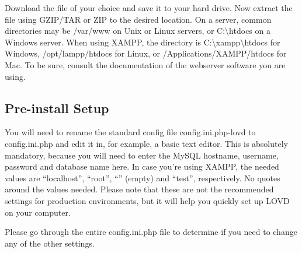 \documentclass[a4paper,oneside,openany,12pt]{memoir}
\begin{document}
Download the file of your choice and save it to your hard drive.
Now extract the file using GZIP/TAR or ZIP to the desired location.
On a server, common directories may be /var/www on Unix or Linux servers, or C:\textbackslash{}htdocs on a Windows server.
When using XAMPP, the directory is C:\textbackslash{}xampp\textbackslash{}htdocs for Windows, /opt/lampp/htdocs for Linux, or /Applications/XAMPP/htdocs for Mac.
To be sure, consult the documentation of the webserver software you are using.



\subsection{Pre-install Setup}
You will need to rename the standard config file config.ini.php-lovd to config.ini.php and edit it in, for example, a basic text editor.
This is absolutely mandatory, because you will need to enter the MySQL hostname, username, password and database name here.
In case you're using XAMPP, the needed values are ``localhost'', ``root'', ``'' (empty) and ``test'', respectively. No quotes around the values needed.
Please note that these are not the recommended settings for production environments, but it will help you quickly set up LOVD on your computer.

Please go through the entire config.ini.php file to determine if you need to change any of the other settings.
\end{document}
